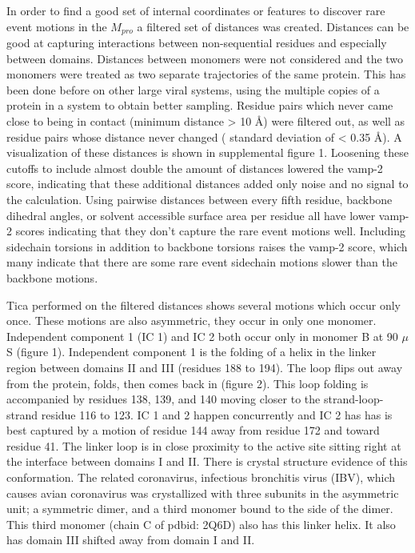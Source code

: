 \documentclass{biophys-new}
\begin{document}
In order to find a good set of internal coordinates or features to discover rare event motions in the $M_{pro}$ a filtered set of distances was created. Distances can be good at capturing interactions between non-sequential residues and especially between domains. Distances between monomers were not considered and the two monomers were treated as two separate trajectories of the same protein. This has been done before on other large viral systems, using the multiple copies of a protein in a system to obtain better sampling.\cite{perilla2017physical, hadden2018all} Residue pairs which never came close to being in contact (minimum distance > 10 Å) were filtered out, as well as residue pairs whose distance never changed ( standard deviation of < 0.35 Å). A visualization of these distances is shown in supplemental figure 1. Loosening these cutoffs to include almost double the amount of distances lowered the vamp-2 score, indicating that these additional distances added only noise and no signal to the calculation. Using pairwise distances between every fifth residue, backbone dihedral angles, or solvent accessible surface area per residue all have lower vamp-2 scores indicating that they don't capture the rare event motions well. Including sidechain torsions in addition to backbone torsions raises the vamp-2 score, which many indicate that there are some rare event sidechain motions slower than the backbone motions.

Tica performed on the filtered distances shows several motions which occur only once. These motions are also asymmetric, they occur in only one monomer. Independent component 1 (IC 1) and IC 2 both occur only in monomer B at 90 $\mu$S (figure 1). Independent component 1 is the folding of a helix in the linker region between domains II and III (residues 188 to 194). The loop flips out away from the protein, folds, then comes back in (figure 2). This loop folding is accompanied by residues 138, 139, and 140 moving closer to the strand-loop-strand residue 116 to 123. IC 1 and 2 happen concurrently and IC 2 has has is best captured by a motion of residue 144 away from residue 172 and toward residue 41. The linker loop is in close proximity to the active site sitting right at the interface between domains I and II. There is crystal structure evidence of this conformation. The related coronavirus, infectious bronchitis virus (IBV), which causes avian coronavirus was crystallized with three subunits in the asymmetric unit; a symmetric dimer, and a third monomer bound to the side of the dimer. This third monomer (chain C of pdbid: 2Q6D) also has this linker helix. It also has domain III shifted away from domain I and II.
\end{document}
